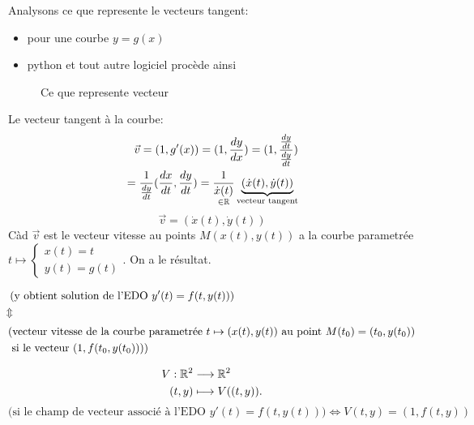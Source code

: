 Analysons ce que represente le vecteurs tangent:
\begin{itemize}
    \item pour une courbe $y = g(x)$
    \item python et tout autre logiciel procède ainsi
\end{itemize}
\begin{figure}[H]
    \centering
    \caption{Ce que represente vecteur}
    \label{fig:analysons-ce-que-represente-vecteur}
\end{figure}
Le vecteur tangent à la courbe:
\begin{align*}
    \vec{v} = (1, g'(x)) = (1, \frac{dy}{dx}) = (1, \frac{\frac{dy}{dt}}{\frac{dy}{dt}})\\
= \frac{1}{\frac{dy}{dt}}(\frac{dx}{dt}, \frac{dy}{dt}) = \underset{\in \mathbb{R}}{ \frac{1}{\dot{x}(t)} }\underbrace{(\dot{x}(t), \dot{y}(t))}_{\text{vecteur tangent}}
\end{align*}
\[
    \vec{v} = (\dot{x}(t), \dot{y}(t))
\] 
Càd $\vec{v}$ est le vecteur vitesse au points  $M(x(t), y(t))$ a la courbe parametrée  $t \mapsto \begin{cases}
    x(t) = t\\
    y(t) = g(t)
\end{cases}$. On a le résultat.
\begin{prop}
    \begin{align*}
        &\left(\text{y obtient solution de l'EDO } y'(t)=f(t, y(t)) \right) \\
        &\rotatebox{90}{$\iff$}\\ 
        &(\text{vecteur vitesse de la courbe parametrée } t \mapsto (x(t), y(t)) \text{ au point } M(t_0) = (t_0, y(t_0))\\ 
        &\text{ si le vecteur } (1, f(t_0, y(t_0))))  
    \end{align*}
\end{prop}
\begin{prop}
   \begin{align*}
       V: \mathbb{R}^2 &\longrightarrow \mathbb{R}^2 \\
       (t, y) &\longmapsto V((t, y))
   .\end{align*} 
   \[
       \text{(si le champ de vecteur associé à l'EDO } y'(t) = f(t, y(t)) \text{)} \iff V(t, y) = (1, f(t, y))
   \] 
\end{prop}
